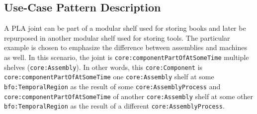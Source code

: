 \subsection*{Use-Case Pattern Description}
A PLA joint can be part of a modular shelf used for storing books and later be repurposed in another modular shelf used for storing tools. The particular example is chosen to emphasize the difference between assemblies and machines as well. In this scenario, the joint is \texttt{core:componentPartOfAtSomeTime} multiple shelves (\texttt{core:Assembly}). In other words, this \texttt{core:Component} is \texttt{core:componentPartOfAtSomeTime} one \texttt{core:Assembly} shelf at some \texttt{bfo:TemporalRegion} as the result of some \texttt{core:AssemblyProcess} and \texttt{core:componentPartOfAtSomeTime} of another \texttt{core:Assembly} shelf at some other \texttt{bfo:TemporalRegion} as the result of a different \texttt{core:AssemblyProcess}.